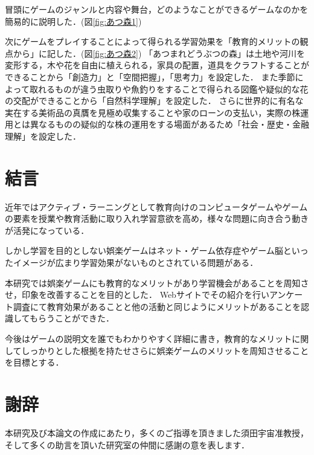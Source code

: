\documentclass[12pt,a4j,titlepage]{ltjsarticle}
\begin{document}
冒頭にゲームのジャンルと内容や舞台，どのようなことができるゲームなのかを簡易的に説明した．(図\ref{fig:あつ森1})

次にゲームをプレイすることによって得られる学習効果を「教育的メリットの観点から」に記した．(図\ref{fig:あつ森2})
「あつまれどうぶつの森」は土地や河川を変形する，木や花を自由に植えられる，家具の配置，道具をクラフトすることができることから「創造力」と「空間把握」，「思考力」を設定した．
また季節によって取れるものが違う虫取りや魚釣りをすることで得られる図鑑や疑似的な花の交配ができることから「自然科学理解」を設定した．
さらに世界的に有名な実在する美術品の真贋を見極め収集することや家のローンの支払い，実際の株運用とは異なるものの疑似的な株の運用をする場面があるため「社会・歴史・金融理解」を設定した．

\clearpage
\section{結言}
近年ではアクティブ・ラーニングとして教育向けのコンピュータゲームやゲームの要素を授業や教育活動に取り入れ学習意欲を高め，様々な問題に向き合う動きが活発になっている．

しかし学習を目的としない娯楽ゲームはネット・ゲーム依存症やゲーム脳といったイメージが広まり学習効果がないものとされている問題がある．

本研究では娯楽ゲームにも教育的なメリットがあり学習機会があることを周知させ，印象を改善することを目的とした．
Webサイトでその紹介を行いアンケート調査にて教育効果があることと他の活動と同じようにメリットがあることを認識してもらうことができた．

今後はゲームの説明文を誰でもわかりやすく詳細に書き，教育的なメリットに関してしっかりとした根拠を持たせさらに娯楽ゲームのメリットを周知させることを目標とする．

\clearpage
\section{謝辞}
本研究及び本論文の作成にあたり，多くのご指導を頂きました須田宇宙准教授，そして多くの助言を頂いた研究室の仲間に感謝の意を表します．
\end{document}
